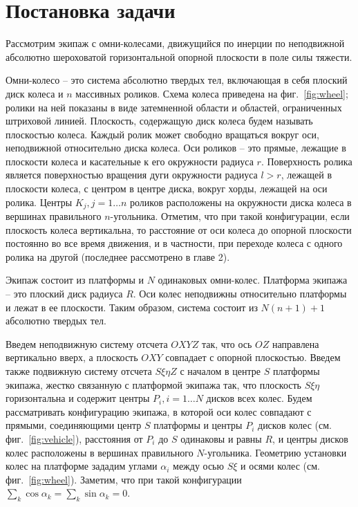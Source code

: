 \section{Постановка задачи}


Рассмотрим экипаж с омни-колесами, движущийся по инерции по неподвижной абсолютно шероховатой горизонтальной опорной плоскости в поле силы тяжести. 

Омни-колесо -- это система абсолютно твердых тел, включающая в себя плоский диск колеса и $n$ массивных роликов. Схема колеса приведена на фиг.~\ref{fig:wheel}; ролики на ней показаны в виде затемненной области и областей, ограниченных штриховой линией. Плоскость, содержащую диск колеса будем называть плоскостью колеса. Каждый ролик может свободно вращаться вокруг оси, неподвижной относительно диска колеса. Оси роликов -- это прямые, лежащие в плоскости колеса и касательные к его окружности радиуса $r$. Поверхность ролика является поверхностью вращения дуги окружности радиуса $l > r$, лежащей в плоскости колеса, с центром в центре диска, вокруг хорды, лежащей на оси ролика. Центры $K_j, j = 1 \ldots n$ роликов расположены на окружности диска колеса в вершинах правильного $n$-угольника. Отметим, что при такой конфигурации, если плоскость колеса вертикальна, то расстояние от оси колеса до опорной плоскости постоянно во все время движения, и в частности, при переходе колеса с одного ролика на другой (последнее рассмотрено в главе 2).

Экипаж состоит из платформы и $N$ одинаковых омни-колес. Платформа экипажа -- это плоский диск радиуса $R$. Оси колес неподвижны относительно платформы и лежат в ее плоскости. Таким образом, система состоит из $N(n+1) + 1$ абсолютно твердых тел.

Введем неподвижную систему отсчета $OXYZ$ так, что ось $OZ$ направлена вертикально вверх, а плоскость $OXY$ совпадает с опорной плоскостью. Введем также подвижную систему отсчета $S\xi\eta Z$ с началом в центре $S$ платформы экипажа, жестко связанную с платформой экипажа так, что плоскость $S\xi\eta$ горизонтальна и содержит центры $P_i, i = 1 \ldots N$ дисков всех колес. Будем рассматривать конфигурацию экипажа, в которой оси колес совпадают с прямыми, соединяющими центр $S$ платформы и центры $P_i$ дисков колес (см. фиг.~\ref{fig:vehicle}), расстояния от $P_i$ до $S$ одинаковы и равны $R$, и центры дисков колес расположены в вершинах правильного $N$-угольника. Геометрию установки колес на платформе зададим углами $\alpha_i$ между осью $S\xi$ и осями колес (см. фиг.~\ref{fig:wheel}). Заметим, что при такой конфигурации $\sum\limits_{k} \cos\alpha_k = \sum\limits_{k}\sin\alpha_k = 0$.

